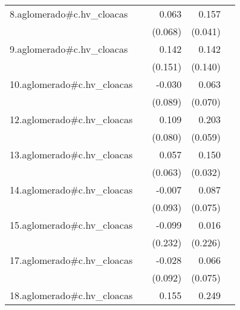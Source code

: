 {\begin{longtable}{l*{4}{D{.}{.}{-1}}}
\addlinespace
8.aglomerado#c.hv\_cloacas&                     &       0.063         &       0.157\sym{***}&                     \\
            &                     &     (0.068)         &     (0.041)         &                     \\
\addlinespace
9.aglomerado#c.hv\_cloacas&                     &       0.142         &       0.142         &                     \\
            &                     &     (0.151)         &     (0.140)         &                     \\
\addlinespace
10.aglomerado#c.hv\_cloacas&                     &      -0.030         &       0.063         &                     \\
            &                     &     (0.089)         &     (0.070)         &                     \\
\addlinespace
12.aglomerado#c.hv\_cloacas&                     &       0.109         &       0.203\sym{***}&                     \\
            &                     &     (0.080)         &     (0.059)         &                     \\
\addlinespace
13.aglomerado#c.hv\_cloacas&                     &       0.057         &       0.150\sym{***}&                     \\
            &                     &     (0.063)         &     (0.032)         &                     \\
\addlinespace
14.aglomerado#c.hv\_cloacas&                     &      -0.007         &       0.087         &                     \\
            &                     &     (0.093)         &     (0.075)         &                     \\
\addlinespace
15.aglomerado#c.hv\_cloacas&                     &      -0.099         &       0.016         &                     \\
            &                     &     (0.232)         &     (0.226)         &                     \\
\addlinespace
17.aglomerado#c.hv\_cloacas&                     &      -0.028         &       0.066         &                     \\
            &                     &     (0.092)         &     (0.075)         &                     \\
\addlinespace
18.aglomerado#c.hv\_cloacas&                     &       0.155\sym{*}  &       0.249\sym{***}&                     \\

\end{longtable}}
